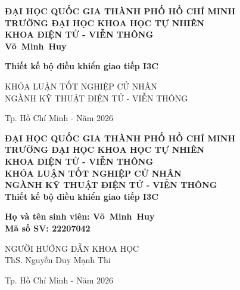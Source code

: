 \documentclass[twoside,a4paper,14pt,openright]{extreport}
\newcommand\myemptypage{
\newpage
\thispagestyle{empty}
\mbox{}
\newpage
}
\newcommand{\tenSV}{Võ~Minh~Huy}
\newcommand{\mssv}{22207042}
\newcommand{\tenKL}{Thiết kế bộ điều khiển giao tiếp I3C}
\newcommand{\tenGVHD}{ThS. Nguyễn Duy Mạnh Thi}
\begin{document}
\hypersetup{pageanchor=false}
\begin{titlepage}

\begin{center}
\textbf{ĐẠI HỌC QUỐC GIA THÀNH PHỐ HỒ CHÍ MINH\\
TRƯỜNG ĐẠI HỌC KHOA HỌC TỰ NHIÊN\\
KHOA ĐIỆN TỬ - VIỄN THÔNG}\\[2cm]

{ \Large \bfseries \tenSV \\[2cm] }

{ \Large \bfseries \tenKL \\[5cm]}

\large KHÓA LUẬN TỐT NGHIỆP CỬ NHÂN\\
\large NGÀNH KỸ THUẬT ĐIỆN TỬ - VIỄN THÔNG


\vfill
Tp. Hồ Chí Minh - Năm 2026

\end{center}

\pagebreak

\myemptypage

\begin{center}
\textbf{ĐẠI HỌC QUỐC GIA THÀNH PHỐ HỒ CHÍ MINH\\
TRƯỜNG ĐẠI HỌC KHOA HỌC TỰ NHIÊN\\
KHOA ĐIỆN TỬ - VIỄN THÔNG}\\[2cm]

\large \textbf{KHÓA LUẬN TỐT NGHIỆP CỬ NHÂN}\\
\large \textbf{NGÀNH KỸ THUẬT ĐIỆN TỬ - VIỄN THÔNG}\\[2cm]

{ \Large \bfseries \tenKL \\[2cm] }

{\bfseries Họ và tên sinh viên: \tenSV\\
Mã số SV: \mssv\\[2cm]}

NGƯỜI HƯỚNG DẪN KHOA HỌC\\
\tenGVHD

\vfill
Tp. Hồ Chí Minh - Năm 2026

\end{center}
\thispagestyle{empty}

\myemptypage

\end{titlepage}
\hypersetup{pageanchor=true}
\end{document}
